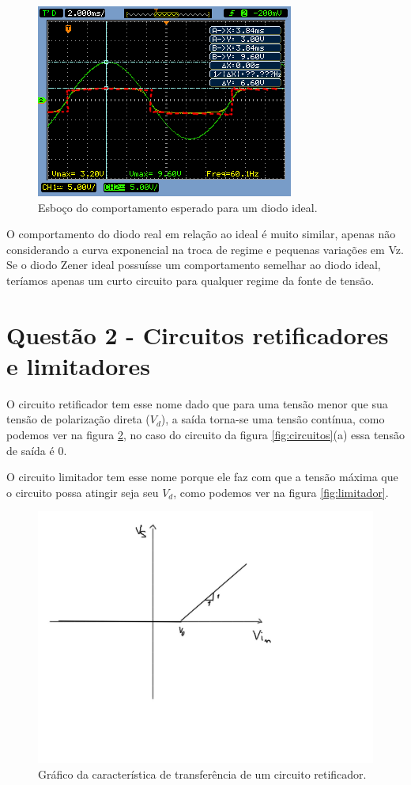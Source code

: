\documentclass{abntex2}
\begin{document}
\begin{figure}[h]
  \centering
  \includegraphics[scale = .7]{circuito-1d-esboco.png}
  \caption{Esboço do comportamento esperado para um diodo ideal.}
  \label{fig:comp4}
\end{figure}

O comportamento do diodo real em relação ao ideal é muito similar, apenas não considerando a curva exponencial na troca de regime e pequenas variações em Vz.
Se o diodo Zener ideal possuísse um comportamento semelhar ao diodo ideal, teríamos apenas um curto circuito para qualquer regime da fonte de tensão.

\section{Questão 2 - Circuitos retificadores e limitadores}

O circuito retificador tem esse nome dado que para uma tensão menor que sua tensão de polarização direta ($V_d$), a saída torna-se uma tensão contínua, como podemos ver na figura \ref{fig:retificador}, no caso do circuito da figura \ref{fig:circuitos}(a) essa tensão de saída é 0.

O circuito limitador tem esse nome porque ele faz com que a tensão máxima que o circuito possa atingir seja seu $V_d$, como podemos ver na figura \ref{fig:limitador}.

\begin{figure}[h]
  \centering
  \includegraphics[width=.8\textwidth]{grafRetificador.jpeg}
  \caption{Gráfico da característica de transferência de um circuito retificador.}
  \label{fig:retificador}
\end{figure}
\end{document}

